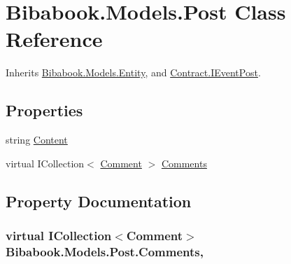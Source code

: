 \hypertarget{class_bibabook_1_1_models_1_1_post}{}\section{Bibabook.\+Models.\+Post Class Reference}
\label{class_bibabook_1_1_models_1_1_post}


Inherits \hyperlink{class_bibabook_1_1_models_1_1_entity}{Bibabook.\+Models.\+Entity}, and \hyperlink{interface_contract_1_1_i_event_post}{Contract.\+I\+Event\+Post}.

\subsection*{Properties}
\begin{DoxyCompactItemize}
\item 
string \hyperlink{class_bibabook_1_1_models_1_1_post_a9c15b7975ca6607251461110097aa280}{Content}
\item 
virtual I\+Collection$<$ \hyperlink{class_bibabook_1_1_models_1_1_comment}{Comment} $>$ \hyperlink{class_bibabook_1_1_models_1_1_post_a95da5c00e529f243e14078679b552c93}{Comments}
\end{DoxyCompactItemize}


\subsection{Property Documentation}
\hypertarget{class_bibabook_1_1_models_1_1_post_a95da5c00e529f243e14078679b552c93}{}
\subsubsection[{Comments}]{\setlength{\rightskip}{0pt plus 5cm}virtual I\+Collection$<${\bf Comment}$>$ Bibabook.\+Models.\+Post.\+Comments\hspace{0.3cm}{\ttfamily [get]}, {\ttfamily [set]}}\label{class_bibabook_1_1_models_1_1_post_a95da5c00e529f243e14078679b552c93}
\hypertarget{class_bibabook_1_1_models_1_1_post_a9c15b7975ca6607251461110097aa280}{}
